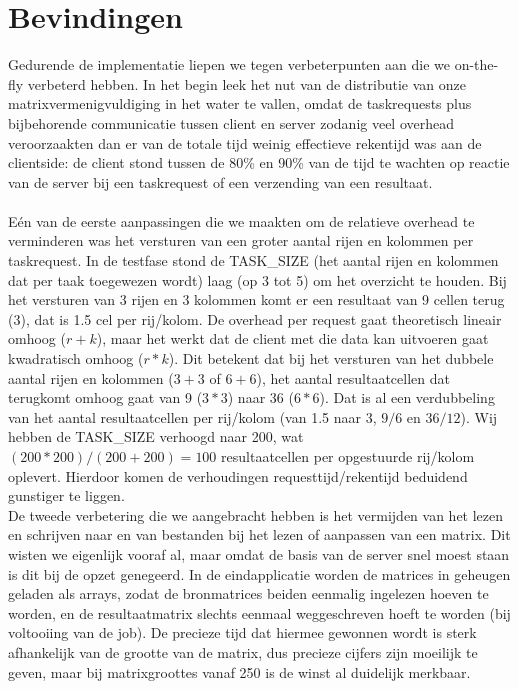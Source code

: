 \documentclass[11pt]{article}
\begin{document}
\section{Bevindingen}
Gedurende de implementatie liepen we tegen verbeterpunten aan die we on-the-fly verbeterd hebben.
In het begin leek het nut van de distributie van onze matrixvermenigvuldiging in het water te
vallen, omdat de taskrequests plus bijbehorende communicatie tussen client en server zodanig
veel overhead veroorzaakten dan er van de totale tijd weinig effectieve rekentijd was aan de
clientside: de client stond tussen de 80\% en 90\% van de tijd te wachten op reactie van de
server bij een taskrequest of een verzending van een resultaat.\\
\\
E\'{e}n van de eerste aanpassingen die we maakten om de relatieve overhead te verminderen was
het versturen van een groter aantal rijen en kolommen per taskrequest. In de testfase stond de
TASK\_SIZE (het aantal rijen en kolommen dat per taak toegewezen wordt) laag (op 3 tot 5) om het
overzicht te houden. Bij het versturen van 3 rijen en 3 kolommen komt er een resultaat van 9 cellen
terug (3), dat is 1.5 cel per rij/kolom. De overhead per request gaat theoretisch lineair omhoog
($r + k$), maar het werkt dat de client met die data kan uitvoeren gaat kwadratisch omhoog ($r * k$).
Dit betekent dat bij het versturen van het dubbele aantal rijen en kolommen ($3 + 3$ of $6 + 6$), het
aantal resultaatcellen dat terugkomt omhoog gaat van 9 ($3 * 3$) naar 36 ($6 * 6$). Dat is al een
verdubbeling van het aantal resultaatcellen per rij/kolom (van 1.5 naar 3, $9/6$ en $36/12$). Wij
hebben de TASK\_SIZE verhoogd naar 200, wat $(200*200)/(200+200) = 100$ resultaatcellen per
opgestuurde rij/kolom oplevert. Hierdoor komen de verhoudingen requesttijd/rekentijd beduidend
gunstiger te liggen.\\
De tweede verbetering die we aangebracht hebben is het vermijden van het lezen en schrijven
naar en van bestanden bij het lezen of aanpassen van een matrix. Dit wisten we eigenlijk vooraf
al, maar omdat de basis van de server snel moest staan is dit bij de opzet genegeerd. In de
eindapplicatie worden de matrices in geheugen geladen als arrays, zodat de bronmatrices beiden
eenmalig ingelezen hoeven te worden, en de resultaatmatrix slechts eenmaal weggeschreven hoeft
te worden (bij voltooiing van de job). De precieze tijd dat hiermee gewonnen wordt is sterk
afhankelijk van de grootte van de matrix, dus precieze cijfers zijn moeilijk te geven, maar bij
matrixgroottes vanaf 250 is de winst al duidelijk merkbaar.
\end{document}
